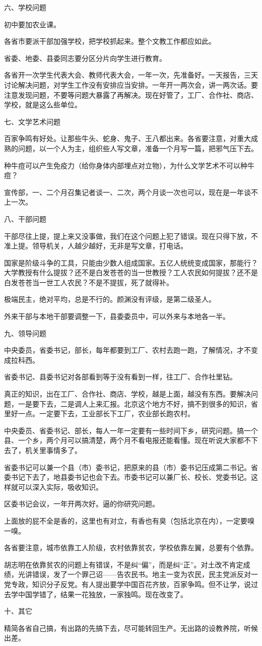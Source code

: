 六、学校问题

初中要加农业课。

各省市要派干部加强学校，把学校抓起来。整个文教工作都应如此。

省委、地委、县委同志要分区分片向学生进行教育。

各省开一次学生代表大会、教师代表大会，一年一次，先准备好。一天报告，三天讨论解决问题，对学生工作没有安排应当安排。一年开一两次会，讲一两次话。要注意发现问题，不要等问题大暴露了再解决。现在好管了，工厂、合作社、商店、学校，就是这么些单位。

七、文学艺术问题

百家争鸣有好处。让那些牛头、蛇身、鬼子、王八都出来。各省要注意，对重大成熟的问题，以一个人为主，组织些人写文章，准备一个月写一篇，把邪气压下去。

种牛痘可以产生免疫力（给你身体内部埋点对立物），为什么文学艺术不可以种牛痘？

宣传部，一、二个月召集记者谈一、二次，两个月谈一次也可以，现在是一年谈不上一次。

八、干部问题

干部尽往上提，提上来又没事做，我们在这个问题上犯了错误。现在只得下放，不准上提。领导机关，人越少越好，无非是写文章，打电话。

国家是阶级斗争的工具，只能由少数人组成国家。五亿人统统变成国家，那能行？大学教授有什么提拔？还不是白发苍苍的当一世教授？工人农民如何提拔？还不是白发苍苍当一世工人农民？不是不提拔，死了就得补。

极端民主，绝对平均，总是不行的。颜渊没有评级，是第二级圣人。

外来干部与本地干部要调整一下，县委委员中，可以外来与本地各一半。

九、领导问题

中央委员，省委书记，部长，每年都要到工厂、农村去跑一跑，了解情况，才不变成拉科西。

省委书记、县委书记对各部看到等于没有看到一样，往工厂、合作社里钻。

真正的知识，出在工厂、合作社、商店、学校，越是上面，越没有东西。要解决问题，一是要下去，二是调人上来汇报。北京这个地方不好，搞不到很多的知识，省里好一点。一定要下去，工业部长下工厂，农业部长跑农村。

中央委员、省委书记、部长，每人一年一定要有一些时间下乡，研究问题。搞一个县、一个乡，两个月可以搞清楚，两个月不看电报还能看懂。现在听说大家都不下去了，机关里事情多了。

省委书记可以兼一个县（市）委书记，把原来的县（市）委书记压成第二书记。省委书记下去了，地县委书记也会下去。市委书记可以兼厂长、校长、党委书记。这样就可以深入实际，吸收知识。

区委书记会议，一年开两次好。逼的你研究问题。

上面放的屁不全是香的，这里也有对立，有香也有臭（包括北京在内），一定要嗅一嗅。

各省要注意，城市依靠工人阶级，农村依靠贫农，学校依靠左翼，总要有个依靠。

胡志明在依靠贫农的问题上有错误，不是纠“偏”，而是纠“正”。对土改不肯定成绩，光讲错误，发了一个罪己诏——告农民书。地主一变为农民，民主党派反对一党专政，知识分子反党。有人提出要学中国百花齐放，百家争鸣。但不让学，说过去学中国学错了，结果一花独放，一家独鸣。现在改变了。

十、其它

精简各省自己搞，有出路的先搞下去，尽可能转回生产。无出路的设教养院，听候出差。


